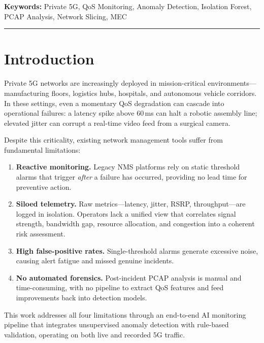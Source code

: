 \documentclass[11pt, a4paper]{article}
\begin{document}
\vspace{4pt}
\noindent\textbf{Keywords:} Private 5G, QoS Monitoring, Anomaly Detection, Isolation Forest, PCAP Analysis, Network Slicing, MEC

\vspace{6pt}
\noindent\rule{\textwidth}{0.4pt}

\section{Introduction}

Private 5G networks are increasingly deployed in mission-critical environments---manufacturing floors, logistics hubs, hospitals, and autonomous vehicle corridors. In these settings, even a momentary QoS degradation can cascade into operational failures: a latency spike above 60\,ms can halt a robotic assembly line; elevated jitter can corrupt a real-time video feed from a surgical camera.

Despite this criticality, existing network management tools suffer from fundamental limitations:

\begin{enumerate}
    \item \textbf{Reactive monitoring.} Legacy NMS platforms rely on static threshold alarms that trigger \emph{after} a failure has occurred, providing no lead time for preventive action.
    \item \textbf{Siloed telemetry.} Raw metrics---latency, jitter, RSRP, throughput---are logged in isolation. Operators lack a unified view that correlates signal strength, bandwidth gap, resource allocation, and congestion into a coherent risk assessment.
    \item \textbf{High false-positive rates.} Single-threshold alarms generate excessive noise, causing alert fatigue and missed genuine incidents.
    \item \textbf{No automated forensics.} Post-incident PCAP analysis is manual and time-consuming, with no pipeline to extract QoS features and feed improvements back into detection models.
\end{enumerate}

This work addresses all four limitations through an end-to-end AI monitoring pipeline that integrates unsupervised anomaly detection with rule-based validation, operating on both live and recorded 5G traffic.

\end{document}
